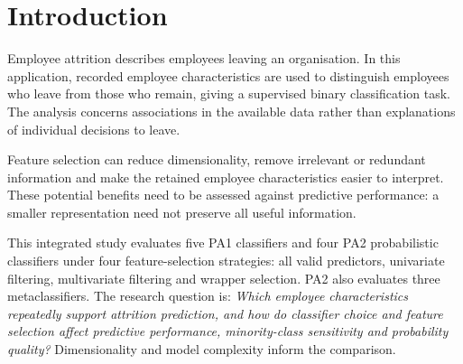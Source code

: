 \section{Introduction}
Employee attrition describes employees leaving an organisation. In this application, recorded employee characteristics are used to distinguish employees who leave from those who remain, giving a supervised binary classification task. The analysis concerns associations in the available data rather than explanations of individual decisions to leave.

Feature selection can reduce dimensionality, remove irrelevant or redundant information and make the retained employee characteristics easier to interpret. These potential benefits need to be assessed against predictive performance: a smaller representation need not preserve all useful information.

This integrated study evaluates five PA1 classifiers and four PA2 probabilistic classifiers under four feature-selection strategies: all valid predictors, univariate filtering, multivariate filtering and wrapper selection. PA2 also evaluates three metaclassifiers. The research question is: \emph{Which employee characteristics repeatedly support attrition prediction, and how do classifier choice and feature selection affect predictive performance, minority-class sensitivity and probability quality?} Dimensionality and model complexity inform the comparison.
